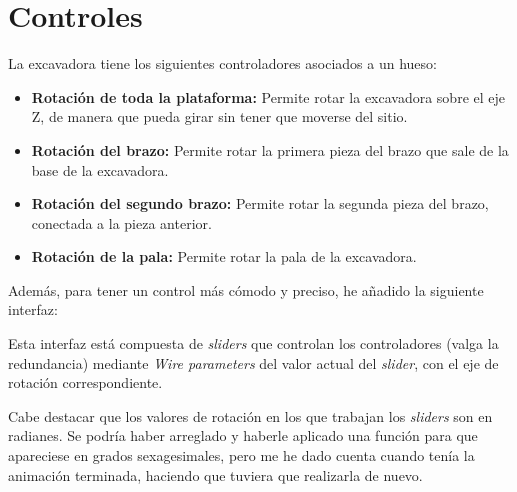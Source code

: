 \section{Controles}

La excavadora tiene los siguientes controladores asociados a un hueso:

\begin{itemize}
    \item \textbf{Rotación de toda la plataforma: }Permite rotar la excavadora sobre el eje Z, de manera que pueda girar sin tener que moverse del sitio.
    

    \item \textbf{Rotación del brazo: }Permite rotar la primera pieza del brazo que sale de la base de la excavadora.
    

    \item \textbf{Rotación del segundo brazo: }Permite rotar la segunda pieza del brazo, conectada a la pieza anterior.
    

    \item \textbf{Rotación de la pala: }Permite rotar la pala de la excavadora.
    

\end{itemize}

\bigskip

Además, para tener un control más cómodo y preciso, he añadido la siguiente interfaz:


Esta interfaz está compuesta de \textit{sliders} que controlan los controladores (valga la redundancia) mediante \textit{Wire parameters} del valor actual del \textit{slider}, con el eje de rotación correspondiente.

\bigskip

Cabe destacar que los valores de rotación en los que trabajan los \textit{sliders} son en radianes. Se podría haber arreglado y haberle aplicado una función para que apareciese en grados sexagesimales, pero me he dado cuenta cuando tenía la animación terminada, haciendo que tuviera que realizarla de nuevo.